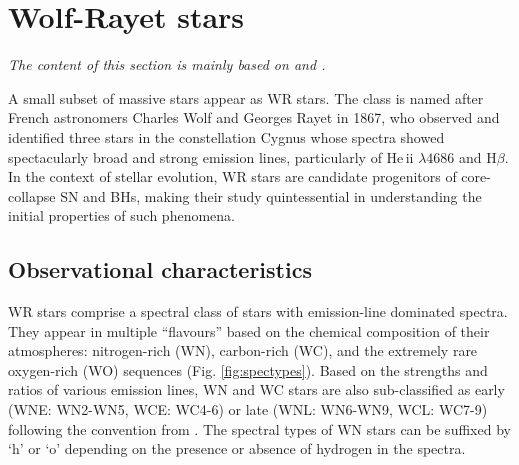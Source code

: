  

\section{Wolf-Rayet stars}\label{sect:wr_intro}

\textit{The content of this section is mainly based on \citet{crowther_physical_2007} and \citet{langer_presupernova_2012}.}

A small subset of massive stars appear as WR stars. The class is named after French astronomers Charles Wolf and Georges Rayet in 1867, who observed and identified three stars in the constellation Cygnus whose spectra showed spectacularly broad and strong emission lines, particularly of He\,{\sc ii} $\lambda 4686$ and H$\beta$. In the context of stellar evolution, WR stars are candidate progenitors of core-collapse SN and BHs, making their study quintessential in understanding the initial properties of such phenomena. 

\subsection{Observational characteristics}\label{sect:wr_obs_char}

WR stars comprise a spectral class of stars with emission-line dominated spectra. They appear in multiple ``flavours'' based on the chemical composition of their atmospheres: nitrogen-rich (WN), carbon-rich (WC), and the extremely rare oxygen-rich (WO) sequences (Fig. \ref{fig:spectypes}). Based on the strengths and ratios of various emission lines, WN and WC stars are also sub-classified as early (WNE: WN2-WN5, WCE: WC4-6) or late (WNL: WN6-WN9, WCL: WC7-9) following the convention from \citet{smith_revised_1968}. The spectral types of WN stars can be suffixed by `h' or `o' depending on the presence or absence of hydrogen in the spectra.

